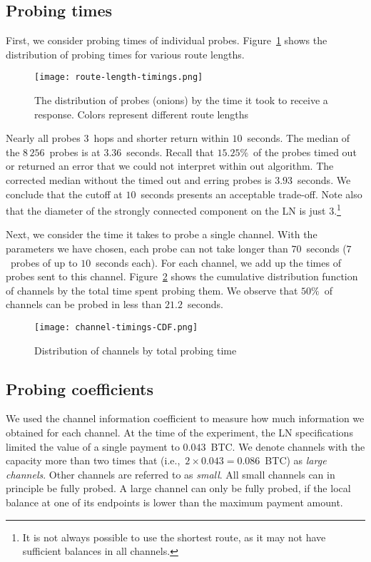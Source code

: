 \subsection{Probing times}

First, we consider probing times of individual probes.
Figure~\ref{fig:route-length-timings} shows the distribution of probing times for various route lengths.

\begin{figure}[ht]
	\centering
	\texttt{[image: route-length-timings.png]}
	\caption{The distribution of probes (onions) by the time it took to receive a response. Colors represent different route lengths}
	\label{fig:route-length-timings}
\end{figure}

Nearly all probes $3$~hops and shorter return within $10$~seconds.
The median of the $8\,256$~probes is at $3.36$~seconds.
Recall that $15.25\%$~of the probes timed out or returned an error that we could not interpret within out algorithm.
The corrected median without the timed out and erring probes is $3.93$~seconds. 
We conclude that the cutoff at $10$~seconds presents an acceptable trade-off.
Note also that the diameter of the strongly connected component on the LN is just $3$.\footnote{It is not always possible to use the shortest route, as it may not have sufficient balances in all channels.}

Next, we consider the time it takes to probe a single channel.
With the parameters we have chosen, each probe can not take longer than $70$~seconds ($7$~probes of up to $10$~seconds each).
For each channel, we add up the times of probes sent to this channel.
Figure~\ref{fig:channel-timings-CDF} shows the cumulative distribution function of channels by the total time spent probing them.
We observe that $50\%$~of channels can be probed in less than $21.2$~seconds.

\begin{figure}[ht]
	\centering
	\texttt{[image: channel-timings-CDF.png]}
	\caption{Distribution of channels by total probing time}
	\label{fig:channel-timings-CDF}
\end{figure}


\subsection{Probing coefficients}

We used the channel information coefficient to measure how much information we obtained for each channel.
At the time of the experiment, the LN specifications limited the value of a single payment to $0.043$~BTC.
We denote channels with the capacity more than two times that (i.e.,~$2 \times 0.043 = 0.086$~BTC) as \textit{large channels}.
Other channels are referred to as \textit{small}.
All small channels can in principle be fully probed.
A large channel can only be fully probed, if the local balance at one of its endpoints is lower than the maximum payment amount.

